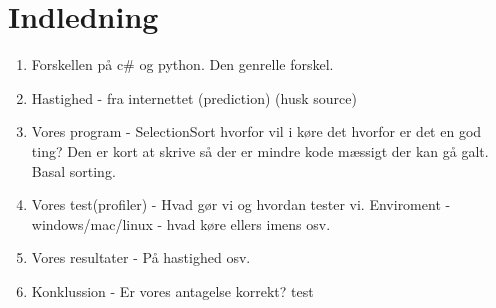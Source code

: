 \documentclass[class=report, crop=false]{standalone}
\begin{document}
    \section{Indledning}
    \begin{enumerate}
        \item Forskellen på c\# og python. Den genrelle forskel.
        \item Hastighed -\> fra internettet (prediction) (husk source)
        \item Vores program -\> SelectionSort hvorfor vil i køre det hvorfor er det en god ting? Den er kort at skrive så der er mindre kode mæssigt der kan gå galt. Basal sorting.
        \item Vores test(profiler) -\> Hvad gør vi og hvordan tester vi. Enviroment - windows/mac/linux - hvad køre ellers imens osv.
        \item Vores resultater -\> På hastighed osv.
        \item Konklussion -\> Er vores antagelse korrekt? test
    \end{enumerate}
\end{document}
